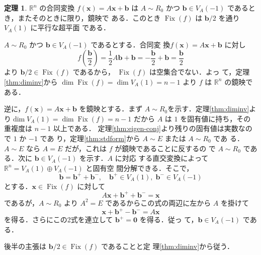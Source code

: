 \documentclass[11pt, uplatex, dvipdfmx, titlepage]{jsarticle}
\makeatletter
\DeclareMathOperator{\Fix}{Fix}
\renewenvironment{proof}[1][\proofname]{\par
  \pushQED{\qed}%
  \normalfont \topsep6\p@\@plus6\p@\relax
  \trivlist
  \item[\hskip\labelsep
         \bfseries
    {#1}]\ignorespaces
}{%
  \popQED\endtrivlist\@endpefalse
}
\theoremstyle{definition}
\newtheorem{theorem}{定理}[section]
\renewcommand{\proofname}{\textbf{証明}}
\makeatother
\begin{document}
\begin{theorem}\label{thm:refconcrete}
  $\mathbb{R}^n$ の合同変換 $f(\bm{x}) = A\bm{x} + \bm{b}$ は $A \sim
  R_0$ かつ $\bm{b} \in V_A(-1)$ であるとき，またそのときに限り，鏡映で
  ある．このとき $\Fix(f)$ は $\bm{b}/2$ を通り $V_A(1)$ に平行な超平面
  である．
\end{theorem}

\begin{proof}
  $A\sim R_0$ かつ $\bm{b} \in V_A(-1)$ であるとする．合同変
  換$f(\bm{x}) = A \bm{x} + \bm{b}$ に対し
  \[
    f\left( \frac{\bm{b}}{2}\right) = \frac{1}{2} A \bm{b} + \bm{b} 
    =-\frac{\bm{b}}{2} + \bm{b} =\frac{\bm{b}}{2} 
  \]
  より $\bm{b}/2 \in \Fix(f)$ であるから， $\Fix(f)$ は空集合でない．よっ
  て，定理\ref{thm:diminv}から $\dim \Fix(f) = \dim V_A(1) =
  n-1$ より $f$ は $\mathbb{R}^n$ の鏡映である．

  逆に，$f(\bm{x}) = A\bm{x} + \bm{b}$ を鏡映とする．まず
  $A \sim
  R_0$を示す．定理\ref{thm:diminv}より$\dim V_A(1) = \dim \Fix(f) =
  n-1$ だから $A$ は $1$ を固有値に持ち，その重複度は $n-1$ 以上である．
  定理\ref{thm:eigen-conj}より残りの固有値は実数なので $1$ か $-1$ であ
  り，定理\ref{thm:stdform}から $A \sim E$ または $A \sim R_0$ であ
  る．$A \sim E$ なら $A=E$ だが，これは $f$ が鏡映であることに反するの
  で $A \sim R_0$ である．次に $\bm{b} \in V_A(-1)$ を示す．$A$ に対応
  する直交変換によって $\mathbb{R}^n = V_A(1) \oplus V_A(-1)$ と固有空
  間分解できる．そこで，
  \[
    \bm{b} = \bm{b}^{+} + \bm{b}^{-}, \quad \bm{b}^{+} \in V_A(1), \; \bm{b}^{-} \in V_A(-1)
  \]
  とする．$\bm{x} \in \Fix(f)$ に対して
  \[
    A\bm{x} + \bm{b}^{+} + \bm{b}^{-} = \bm{x}
  \]
  であるが，$A \sim R_0$ より $A^2 = E$ であるからこの式の両辺に左から $A$ を掛けて
  \[
    \bm{x} + \bm{b}^{+} -\bm{b}^{-} = A\bm{x}
  \]
  を得る．さらにこの2式を連立して $\bm{b}^{+} = \bm{0}$ を得る．従っ
  て，$\bm{b} \in V_A(-1)$ である．

  後半の主張は $\bm{b}/2 \in \Fix(f)$ であることと定
  理\ref{thm:diminv}から従う．
\end{proof}


\end{document}
